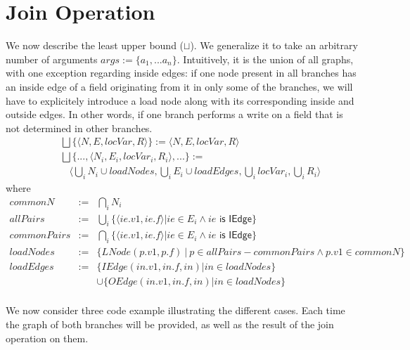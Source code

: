 \section{Join Operation}
We now describe the least upper bound ($\sqcup$). We generalize it to take an
arbitrary number of arguments $args := \{ a_1, ... a_n \}$. Intuitively, it is
the union of all graphs, with one exception regarding inside edges: if one node
present in all branches has an inside edge of a field originating from it in
only some of the branches, we will have to explicitely introduce a load node
along with its corresponding inside and outside edges. In other words, if one
branch performs a write on a field that is not determined in other branches.
\begin{eqnarray*}
    && \bigsqcup \{ \langle N, E, locVar, R \rangle \} := \langle N, E, locVar, R \rangle \\
    &&\bigsqcup \{ ..., \langle N_i, E_i, locVar_i, R_i \rangle, ... \} := \\
    && ~~~~ \langle \bigcup_i N_i \cup loadNodes, \bigcup_i E_i \cup loadEdges, \bigcup_i locVar_i, \bigcup_i R_i \rangle
\end{eqnarray*}
    where
\begin{eqnarray*}
    commonN &:=& \bigcap_i N_i \\
    allPairs &:=&  \bigcup_i \{ \langle ie.v1, ie.f \rangle | ie \in E_i \land ie \textsf { is IEdge}\} \\
    commonPairs &:=&  \bigcap_i \{ \langle ie.v1, ie.f \rangle | ie \in E_i \land ie \textsf { is IEdge}\} \\
    loadNodes &:=&  \{ LNode(p.v1, p.f) ~|~ p \in allPairs - commonPairs \land p.v1 \in commonN \} \\
    loadEdges &:=& \{ IEdge(in.v1, in.f, in) | in \in loadNodes \} \\
                 && \cup \{ OEdge(in.v1, in.f, in) | in \in loadNodes \} \\
\end{eqnarray*}

We now consider three code example illustrating the different cases. Each time
the graph of both branches will be provided, as well as the result of the join
operation on them.

